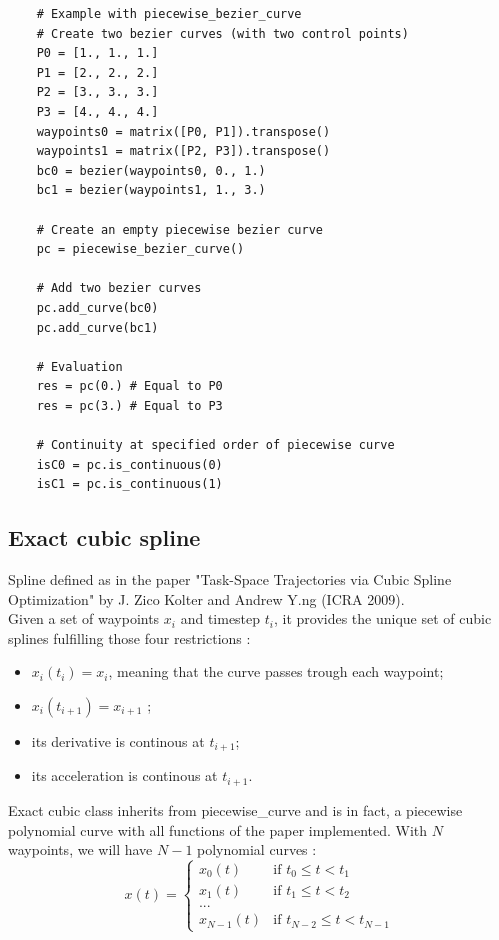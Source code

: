 \documentclass{article}
\begin{document}
    \begin{lstlisting}
    # Example with piecewise_bezier_curve
    # Create two bezier curves (with two control points)
    P0 = [1., 1., 1.]
    P1 = [2., 2., 2.]
    P2 = [3., 3., 3.]
    P3 = [4., 4., 4.]
    waypoints0 = matrix([P0, P1]).transpose()
    waypoints1 = matrix([P2, P3]).transpose()
    bc0 = bezier(waypoints0, 0., 1.)
    bc1 = bezier(waypoints1, 1., 3.)
    
    # Create an empty piecewise bezier curve
    pc = piecewise_bezier_curve()
    
    # Add two bezier curves
    pc.add_curve(bc0)
    pc.add_curve(bc1)
    
    # Evaluation
    res = pc(0.) # Equal to P0
    res = pc(3.) # Equal to P3
    
    # Continuity at specified order of piecewise curve
    isC0 = pc.is_continuous(0)
    isC1 = pc.is_continuous(1)
    \end{lstlisting}

\subsection{Exact cubic spline}

    Spline defined as in the paper "Task-Space Trajectories via Cubic Spline Optimization" by J. Zico Kolter and Andrew Y.ng (ICRA 2009).\\
    Given a set of waypoints $x_i$ and timestep $t_i$, it provides the unique set of cubic splines fulfilling those four restrictions :
    \begin{itemize}
        \item $x_i(t_i) = x_i$, meaning that the curve passes trough each waypoint;
        \item $x_i(t_{i+1}) = x_{i+1}$ ;
        \item its derivative is continous at $t_{i+1}$;
        \item its acceleration is continous at $t_{i+1}$.
    \end{itemize}
    Exact cubic class inherits from piecewise\_curve and is in fact, a piecewise polynomial curve with all functions of the paper implemented. With $N$ waypoints, we will have $N-1$ polynomial curves :\\
    \begin{equation}
        x(t)=
        \begin{cases}
            x_0(t) &\mbox{if } t_0 \leq t< t_1\\
            x_1(t) &\mbox{if } t_1 \leq t< t_2\\
            ...\\
            x_{N-1}(t) &\mbox{if } t_{N-2} \leq t< t_{N-1}
        \end{cases}
    \end{equation}
\end{document}
